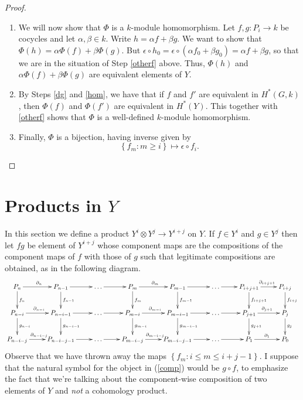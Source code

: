 \documentclass[12pt]{article}
\begin{document}
\begin{proof}
\begin{enumerate}
\item\label{hom}
We will now show that $\Phi$ is a $k$-module homomorphism.
Let $f,g:P_i\to k$ be cocycles and let $\alpha,\beta\in k$.
Write $h=\alpha f+\beta g$. We want to show that 
$\Phi\left(h\right)=\alpha\Phi\left(f\right)+\beta\Phi\left(g\right)$.
But $\epsilon\circ h_0=\epsilon\circ\left(\alpha f_0+\beta g_0\right)
=\alpha f+\beta g$, so that we are in the situation
of Step \ref{otherf} above. Thus, 
$\Phi\left(h\right)$ and 
$\alpha\Phi\left(f\right)+\beta\Phi\left(g\right)$
are equivalent elements of $Y$.

\item By Steps \ref{dg} and \ref{hom}, we have that
if $f$ and $f'$ are equivalent in $H^\ast\left(G,k\right)$,
then $\Phi\left(f\right)$ and $\Phi\left(f'\right)$
are equivalent in $H^\ast\left(Y\right)$.
This together with \ref{otherf} shows that $\Phi$ is a 
well-defined $k$-module homomorphism.

\item Finally, $\Phi$ is a bijection, having inverse given by
\[\left\{f_m:m\ge i\right\}\mapsto\epsilon\circ f_i.\]
\end{enumerate}
\end{proof}

\section{Products in $Y$}
In this section we define a product 
$Y^i\otimes Y^j\to Y^{i+j}$ on $Y$.
If $f\in Y^i$ and $g\in Y^j$ then let $fg$ be 
element of $Y^{i+j}$ whose component maps are
the compositions of the component
maps of $f$ with those of $g$ such that legitimate
compositions are obtained, as in the following diagram.
\begin{equation}\label{comp}\xymatrix{
P_n\ar[r]^{\partial_n}\ar[d]^{f_n}
&P_{n-1}\ar[d]^{f_{n-1}}\ar[r]
&\dots\ar[r]
&P_m\ar[r]^{\partial_m}\ar[d]^{f_m}
&P_{m-1}\ar[r]\ar[d]^{f_{m-1}}
&\dots\ar[r]
&P_{i+j+1}\ar[r]^{\partial_{i+j+1}}\ar[d]^{f_{i+j+1}}
&P_{i+j}\ar[d]^{f_{i+j}}
\\
P_{n-i}\ar[r]^{\partial_{n-i}}\ar[d]^{g_{n-i}}
&P_{n-i-1}\ar[r]\ar[d]^{g_{n-i-1}}
&\dots\ar[r]
&P_{m-i}\ar[r]^{\partial_{m-i}}\ar[d]^{g_{m-i}}
&P_{m-i-1}\ar[r]\ar[d]^{g_{m-i-1}}
&\dots\ar[r]
&P_{j+1}\ar[r]^{\partial_{j+1}}\ar[d]^{g_{j+1}}
&P_j\ar[d]^{g_j}
\\
P_{n-i-j}\ar[r]^{\partial_{n-i-j}}
&P_{n-i-j-1}\ar[r]
&\dots\ar[r]
&P_{m-i-j}\ar[r]^{\partial_{m-i-j}}
&P_{m-i-j-1}\ar[r]
&\dots\ar[r]
&P_1\ar[r]^{\partial_1}
&P_0
}\end{equation}
Observe that we have thrown away the maps 
$\left\{f_m:i\le m\le i+j-1\right\}$.
I suppose that the natural symbol 
for the object in (\ref{comp}) 
would be $g\circ f$, to emphasize
the fact that we're talking about
the component-wise composition of two elements of $Y$
and {\em not} a cohomology product.
\end{document}
